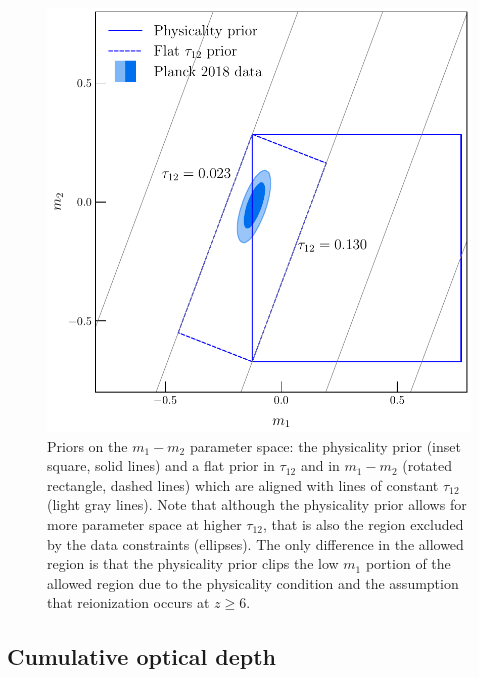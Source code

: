 \documentclass[prd,twocolumn,amsmath,amssymb,floatfix,superscriptaddress,nofootinbib]{revtex4-1}
\newcommand{\ch}[1]{\textcolor{red}{#1}}
\begin{document}
{ \begin{figure}
          \includegraphics[width=0.9\columnwidth]{paper/plots/pl18_pc_zmax30_pliklite_srollv2_1015_plot_rotated_box_flat_tau12.pdf}
          \caption {Priors on the $m_1-m_2$ parameter space: the physicality prior (inset square, solid lines) and a flat prior in
           $\tau_{12}$ and in $m_1-m_2$ (rotated rectangle, dashed lines) 
           which are aligned with lines of constant $\tau_{12}$ (light gray lines). Note that although the physicality prior allows for more parameter space at higher $\tau_{12}$, that is also the region excluded by the data constraints (ellipses). The only difference in the allowed region is that the physicality prior clips the low $m_1$ portion of the allowed region due to the physicality condition and the assumption that reionization occurs at $z\ge 6$.} 
          \label{fig:prior_box}
\end{figure}





%
%
%
\subsection{Cumulative optical depth}

}
\end{document}
